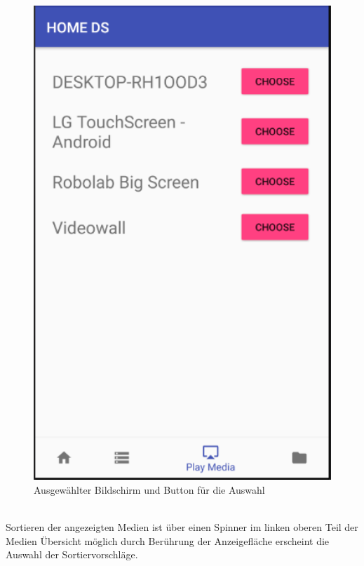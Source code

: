 \\
\begin{figure}[H]
\centering
\includegraphics[width=1.0\textwidth]{images/06_AndroidApp/06_displayChoice}
\caption{Ausgewählter Bildschirm und Button für die Auswahl}
\label{fig:mediaNav}
\end{figure}
\\
Sortieren der angezeigten Medien ist über einen Spinner im linken oberen Teil der Medien Übersicht möglich durch Berührung der Anzeigefläche erscheint die Auswahl der Sortiervorschläge.
